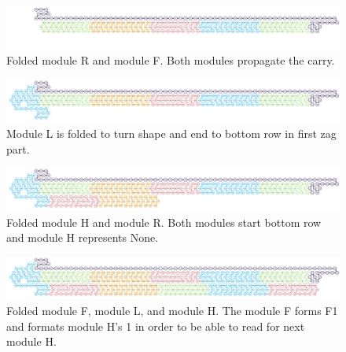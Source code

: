 \documentclass[runningheads]{llncs}
\begin{document}
\begin{figure}[tb]
\centering
\includegraphics[width=\linewidth]{fig/svg/CounterEx5.pdf}
\caption{
Folded module R and module F. Both modules propagate the carry.
}
\label{fig:counterex5}
\end{figure}

\begin{figure}[tb]
\centering
\includegraphics[width=\linewidth]{fig/svg/CounterEx6.pdf}
\caption{
Module L is folded to turn shape and end to bottom row in first zag part.
}
\label{fig:counterex6}
\end{figure}

\begin{figure}[tb]
\centering
\includegraphics[width=\linewidth]{fig/svg/CounterEx8.pdf}
\caption{
Folded module H and module R. Both modules start bottom row and module H represents None.
}
\label{fig:counterex8}
\end{figure}


\begin{figure}[tb]
\centering
\includegraphics[width=\linewidth]{fig/svg/CounterEx11.pdf}
\caption{
Folded module F, module L, and module H.  The module F forms F1 and formats module H's 1 in order to be able to read for next module H.
}
\label{fig:counterex11}
\end{figure}



  
\end{document}
